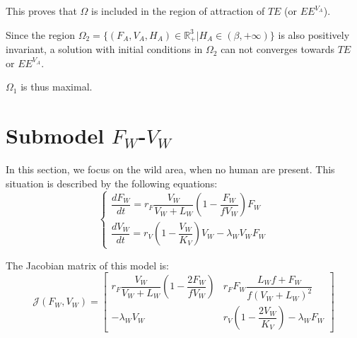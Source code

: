 \documentclass{article}
\newcommand{\lfv}{\lambda_{W}}
\begin{document}
This proves that $\Omega$ is included in the region of attraction of $TE$ (or $EE^{V_A}$).


Since the region $\Omega_2 = \{(F_{A}, V_{A}, H_{A}) \in \mathbb{R}_+^3 | H_{A} \in (\beta, +\infty) \}$ is also positively invariant, a solution with initial conditions in $\Omega_2$ can not converges towards $TE$ or $EE^{V_A}$.

$\Omega_1$ is thus maximal.


\newpage 
\section{Submodel $F_W$-$V_W$}
In this section, we focus on the wild area, when no human are present. This situation is described by the following equations:
\begin{equation}
\left\lbrace \begin{array}{l}
\dfrac{dF_W}{dt} = r_F \dfrac{V_W}{V_W + L_W} \left(1 - \dfrac{F_W}{f V_W}\right) F_W \\
\dfrac{dV_W}{dt} = r_V \left(1 - \dfrac{V_W}{K_V}\right) V_W - \lfv V_W F_W
\end{array} \right.
\label{wildFV}
\end{equation}

The Jacobian matrix of this model is:
\begin{equation*}
\mathcal{J}(F_W, V_W) = \begin{bmatrix}
r_F \dfrac{V_W}{V_W + L_W} \left(1 - \dfrac{2F_W}{fV_W}\right) & r_F F_W \dfrac{L_W f + F_W}{f (V_W + L_W)^2} \\
-\lfv V_W & r_V \left(1 - \dfrac{2V_W}{K_V}\right) - \lfv F_W
\end{bmatrix}
\end{equation*}
\end{document}
